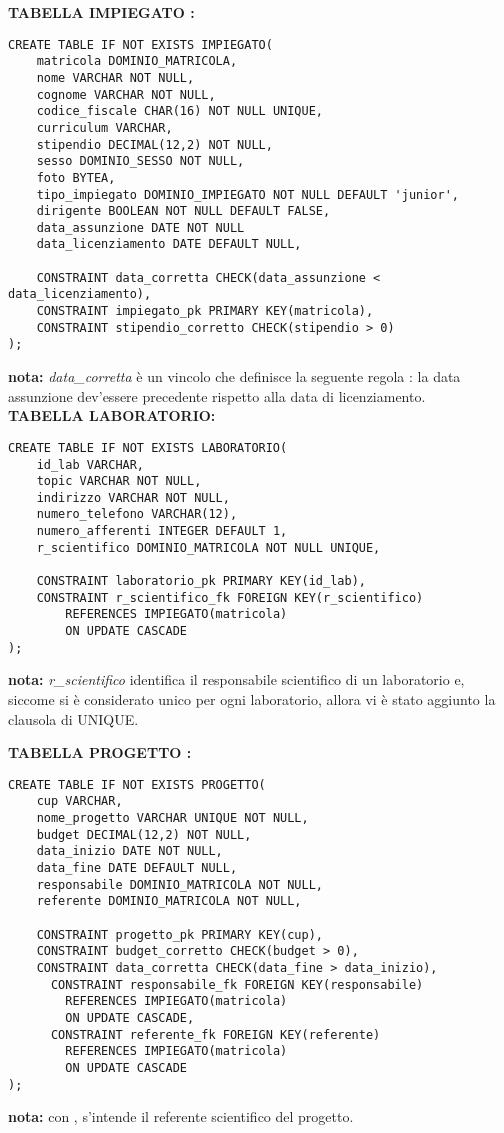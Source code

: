 \textbf{TABELLA IMPIEGATO :}
\scriptsize
\begin{lstlisting}
CREATE TABLE IF NOT EXISTS IMPIEGATO(
	matricola DOMINIO_MATRICOLA,
	nome VARCHAR NOT NULL,
	cognome VARCHAR NOT NULL,
	codice_fiscale CHAR(16) NOT NULL UNIQUE, 
	curriculum VARCHAR,
	stipendio DECIMAL(12,2) NOT NULL,
	sesso DOMINIO_SESSO NOT NULL,
	foto BYTEA,
	tipo_impiegato DOMINIO_IMPIEGATO NOT NULL DEFAULT 'junior',
	dirigente BOOLEAN NOT NULL DEFAULT FALSE,
	data_assunzione DATE NOT NULL
	data_licenziamento DATE DEFAULT NULL,

	CONSTRAINT data_corretta CHECK(data_assunzione < data_licenziamento),
	CONSTRAINT impiegato_pk PRIMARY KEY(matricola),
	CONSTRAINT stipendio_corretto CHECK(stipendio > 0)
);
\end{lstlisting}
\normalsize
\textbf{nota:} \textit{data\_corretta} è un vincolo che definisce la seguente regola : la data assunzione dev'essere precedente rispetto alla data di licenziamento.\\

\noindent\textbf{TABELLA LABORATORIO:}
\scriptsize
\begin{lstlisting}
CREATE TABLE IF NOT EXISTS LABORATORIO(
	id_lab VARCHAR,
	topic VARCHAR NOT NULL,
	indirizzo VARCHAR NOT NULL,
	numero_telefono VARCHAR(12), 
	numero_afferenti INTEGER DEFAULT 1,
	r_scientifico DOMINIO_MATRICOLA NOT NULL UNIQUE,

	CONSTRAINT laboratorio_pk PRIMARY KEY(id_lab),
	CONSTRAINT r_scientifico_fk FOREIGN KEY(r_scientifico) 
        REFERENCES IMPIEGATO(matricola)
		ON UPDATE CASCADE
);
\end{lstlisting}
\normalsize
\textbf{nota:} \textit{r\_scientifico} identifica il responsabile scientifico di un laboratorio e, siccome si è considerato unico per ogni laboratorio, allora vi è stato aggiunto la clausola di UNIQUE.\\

\newpage

\noindent\textbf{TABELLA PROGETTO :}
\scriptsize
\begin{lstlisting}
CREATE TABLE IF NOT EXISTS PROGETTO(
	cup VARCHAR,
	nome_progetto VARCHAR UNIQUE NOT NULL,
	budget DECIMAL(12,2) NOT NULL,
	data_inizio DATE NOT NULL,
	data_fine DATE DEFAULT NULL,  
	responsabile DOMINIO_MATRICOLA NOT NULL, 
	referente DOMINIO_MATRICOLA NOT NULL,  
	
	CONSTRAINT progetto_pk PRIMARY KEY(cup),
	CONSTRAINT budget_corretto CHECK(budget > 0),
	CONSTRAINT data_corretta CHECK(data_fine > data_inizio),
	  CONSTRAINT responsabile_fk FOREIGN KEY(responsabile) 
        REFERENCES IMPIEGATO(matricola)
		ON UPDATE CASCADE,
	  CONSTRAINT referente_fk FOREIGN KEY(referente) 
        REFERENCES IMPIEGATO(matricola)
		ON UPDATE CASCADE
);
\end{lstlisting}
\normalsize
\textbf{nota:} con  , s'intende il referente scientifico del progetto.\\

